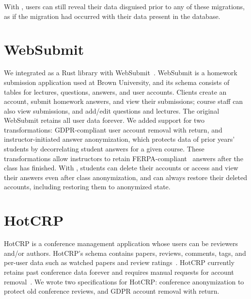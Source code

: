 %
With \sys, users can still reveal their data disguised prior to any of these
migrations, as if the migration had occurred with their data present in the
database.


\section{WebSubmit}
\label{s:case-websubmit}

%
We integrated \sys as a Rust library with WebSubmit~\cite{websubmit-rs}.
%
WebSubmit is a homework submission application used at Brown University, and
its schema consists of tables for lectures, questions, answers, and user accounts.
%
Clients create an account, submit homework answers, and view their submissions;
course staff can also view submissions, and add/edit questions and lectures.
%
The original WebSubmit retains all user data forever.
%
We added support for two \xxing
transformations: {GDPR-compliant user account removal} with return, and
{instructor-initiated answer anonymization}, which protects data of prior years'
students by decorrelating student answers for a given course.
%
These transformations allow instructors to retain FERPA-compliant~\cite{ferpa}
answers after the class has finished. %
%
With \sys, students can delete their
accounts or access and view their answers even after class anonymization,
and can always restore their deleted accounts, including restoring them to
anonymized state.
%
%


\section{HotCRP}
\label{s:case-hotcrp}

%
HotCRP is a conference management application whose users can be reviewers and/or
authors.
%
HotCRP's schema contains papers, reviews, comments, tags,
and per-user data such as watched papers and review ratings~\cite{hotcrp}.
%
HotCRP currently retains past conference data forever and requires manual
requests for account removal~\cite{hotcrp:privacy}.
%
We wrote two \xx specifications for HotCRP: conference anonymization to
protect old conference reviews, and GDPR account removal with
return.
%

